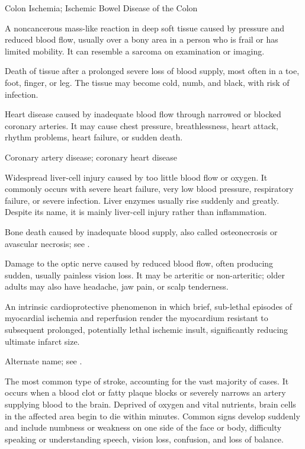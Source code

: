 \synonyms
Colon Ischemia; Ischemic Bowel Disease of the Colon

 A noncancerous mass-like reaction in deep soft tissue caused by pressure and reduced blood flow, usually over a bony area in a person who is frail or has limited mobility. It can resemble a sarcoma on examination or imaging.

 Death of tissue after a prolonged severe loss of blood supply, most often in a toe, foot, finger, or leg. The tissue may become cold, numb, and black, with risk of infection.

 Heart disease caused by inadequate blood flow through narrowed or blocked coronary arteries. It may cause chest pressure, breathlessness, heart attack, rhythm problems, heart failure, or sudden death.

\synonyms
Coronary artery disease; coronary heart disease

 Widespread liver-cell injury caused by too little blood flow or oxygen. It commonly occurs with severe heart failure, very low blood pressure, respiratory failure, or severe infection. Liver enzymes usually rise suddenly and greatly. Despite its name, it is mainly liver-cell injury rather than inflammation.

 Bone death caused by inadequate blood supply, also called osteonecrosis or avascular necrosis; see .

 Damage to the optic nerve caused by reduced blood flow, often producing sudden, usually painless vision loss. It may be arteritic or non-arteritic; older adults may also have headache, jaw pain, or scalp tenderness.

 An intrinsic cardioprotective phenomenon in which brief, sub-lethal episodes of myocardial ischemia and reperfusion render the myocardium resistant to subsequent prolonged, potentially lethal ischemic insult, significantly reducing ultimate infarct size.

 Alternate name; see .

 The most common type of stroke, accounting for the vast majority of cases. It occurs when a blood clot or fatty plaque blocks or severely narrows an artery supplying blood to the brain. Deprived of oxygen and vital nutrients, brain cells in the affected area begin to die within minutes. Common signs develop suddenly and include numbness or weakness on one side of the face or body, difficulty speaking or understanding speech, vision loss, confusion, and loss of balance.

